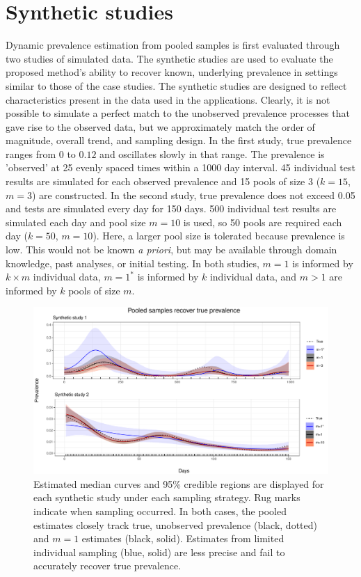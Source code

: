 \documentclass{article}
\begin{document}
\section{Synthetic studies}


Dynamic prevalence estimation from pooled samples is first evaluated through two studies of simulated data. The synthetic studies are used to evaluate the proposed method's ability to recover known, underlying prevalence in settings similar to those of the case studies. The synthetic studies are designed to reflect characteristics present in the data used in the applications. Clearly, it is not possible to simulate a perfect match to the unobserved prevalence processes that gave rise to the observed data, but we approximately match the order of magnitude, overall trend, and sampling design. In the first study, true prevalence ranges from $0$ to $0.12$ and oscillates slowly in that range. The prevalence is 'observed' at 25 evenly spaced times within a 1000 day interval. 45 individual test results are simulated for each observed prevalence and 15 pools of size 3 ($k=15$, $m=3$) are constructed. In the second study, true prevalence does not exceed 0.05 and tests are simulated every day for 150 days. 500 individual test results are simulated each day and pool size $m=10$ is used, so 50 pools are required each day ($k=50$, $m=10$). Here, a larger pool size is tolerated because prevalence is low. This would not be known\emph{ a priori}, but may be available through domain knowledge, past analyses, or initial testing. In both studies, $m=1$ is informed by $k\times m$ individual data, $m=1^*$ is informed by $k$ individual data, and $m>1$ are informed by $k$ pools of size $m$. 

\begin{figure}[h!]
\centerline{\includegraphics[width=.8\textwidth]{Figure1.pdf}}
\caption{Estimated median curves and 95\% credible regions are displayed for each synthetic study under each sampling strategy. Rug marks indicate when sampling occurred. In both cases, the pooled estimates closely track true, unobserved prevalence (black, dotted) and $m=1$ estimates (black, solid). Estimates from limited individual sampling (blue, solid) are less precise and fail to accurately recover true prevalence. \label{fig1}}
\end{figure}
\end{document}
